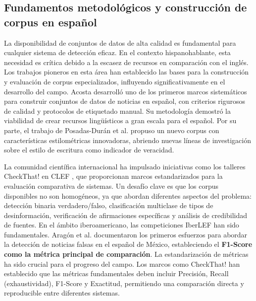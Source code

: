 \subsection{Fundamentos metodológicos y construcción de corpus en español}

La disponibilidad de conjuntos de datos de alta calidad es fundamental para cualquier sistema de detección eficaz. En el contexto hispanohablante, esta necesidad es crítica debido a la escasez de recursos en comparación con el inglés. Los trabajos pioneros en esta área han establecido las bases para la construcción y evaluación de corpus especializados, influyendo significativamente en el desarrollo del campo. Acosta \cite{acosta2019construccion} desarrolló uno de los primeros marcos sistemáticos para construir conjuntos de datos de noticias en español, con criterios rigurosos de calidad y protocolos de etiquetado manual. Su metodología demostró la viabilidad de crear recursos lingüísticos a gran escala para el español. Por su parte, el trabajo de Posadas-Durán et al. \cite{posadas2019detection} propuso un nuevo corpus con características estilométricas innovadoras, abriendo nuevas líneas de investigación sobre el estilo de escritura como indicador de veracidad.

La comunidad científica internacional ha impulsado iniciativas como los talleres CheckThat! en CLEF \cite{alam2023overview, barron2023clef}, que proporcionan marcos estandarizados para la evaluación comparativa de sistemas. Un desafío clave es que los corpus disponibles no son homogéneos, ya que abordan diferentes aspectos del problema: detección binaria verdadero/falso, clasificación multiclase de tipos de desinformación, verificación de afirmaciones específicas y análisis de credibilidad de fuentes. En el ámbito iberoamericano, las competiciones IberLEF han sido fundamentales. Aragón et al. \cite{aragon2020overview} documentaron los primeros esfuerzos para abordar la detección de noticias falsas en el español de México, estableciendo el \textbf{F1-Score como la métrica principal de comparación}. La estandarización de métricas ha sido crucial para el progreso del campo. Los marcos como CheckThat! \cite{barron2023clef} han establecido que las métricas fundamentales deben incluir Precisión, Recall (exhaustividad), F1-Score y Exactitud, permitiendo una comparación directa y reproducible entre diferentes sistemas.

